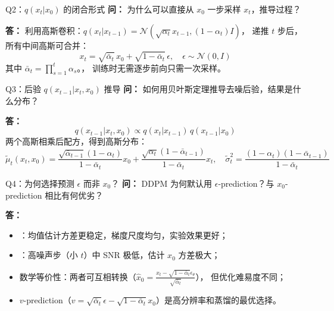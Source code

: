\begin{conceptbox}{Q2：$q(x_t|x_0)$ 的闭合形式}
\textbf{问：} 为什么可以直接从 $x_0$ 一步采样 $x_t$，推导过程？

\textbf{答：}
利用高斯卷积：$q(x_t|x_{t-1})=\mathcal{N}(\sqrt{\alpha_t}x_{t-1},(1-\alpha_t)I)$，
递推 $t$ 步后，所有中间高斯可合并：
\[
  x_t = \sqrt{\bar\alpha_t}\,x_0 + \sqrt{1-\bar\alpha_t}\,\epsilon, \quad \epsilon\sim\mathcal{N}(0,I)
\]
其中 $\bar\alpha_t = \prod_{s=1}^{t}\alpha_s$。，
训练时无需逐步前向只需一次采样。
\end{conceptbox}

\begin{conceptbox}{Q3：后验 $q(x_{t-1}|x_t,x_0)$ 推导}
\textbf{问：} 如何用贝叶斯定理推导去噪后验，结果是什么分布？

\textbf{答：}
\[
  q(x_{t-1}|x_t,x_0) \propto q(x_t|x_{t-1})\,q(x_{t-1}|x_0)
\]
两个高斯相乘后配方，得到高斯分布：
\[
  \tilde\mu_t(x_t,x_0)=\frac{\sqrt{\bar\alpha_{t-1}}(1-\alpha_t)}{1-\bar\alpha_t}x_0
  +\frac{\sqrt{\alpha_t}(1-\bar\alpha_{t-1})}{1-\bar\alpha_t}x_t,
  \quad
  \tilde\sigma_t^2=\frac{(1-\alpha_t)(1-\bar\alpha_{t-1})}{1-\bar\alpha_t}
\]
\end{conceptbox}

\begin{conceptbox}{Q4：为何选择预测 $\epsilon$ 而非 $x_0$？}
\textbf{问：} DDPM 为何默认用 $\epsilon$-prediction？与 $x_0$-prediction 相比有何优劣？

\textbf{答：}
\begin{itemize}
  \item {}：均值估计方差更稳定，梯度尺度均匀，实验效果更好；
  \item {}：高噪声步（小 $t$）中 SNR 极低，估计 $x_0$ 方差极大；
  \item 数学等价性：两者可互相转换（$\hat x_0 = \frac{x_t - \sqrt{1-\bar\alpha_t}\epsilon_\theta}{\sqrt{\bar\alpha_t}}$），
    但优化难易度不同；
  \item $v$-prediction（$v = \sqrt{\bar\alpha_t}\epsilon - \sqrt{1-\bar\alpha_t}x_0$）是高分辨率和蒸馏的最优选择。
\end{itemize}
\end{conceptbox}

